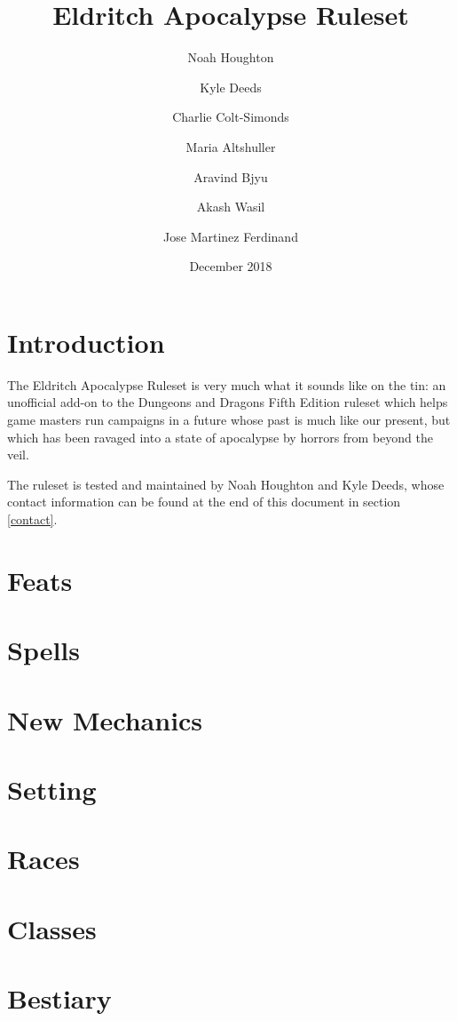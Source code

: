 \documentclass[letterpaper,10pt,twoside,twocolumn,openany]{dndbook}
\title{Eldritch Apocalypse Ruleset}
\author{Noah Houghton\and Kyle Deeds\and Charlie Colt-Simonds\and Maria Altshuller\and Aravind Bjyu\and Akash Wasil\and Jose Martinez Ferdinand}
\date{December 2018}
\begin{document}
\maketitle

\tableofcontents

\part{Introduction}
The Eldritch Apocalypse Ruleset is very much what it sounds like on the tin: an unofficial add-on to the Dungeons and Dragons Fifth Edition ruleset which helps game masters run campaigns in a future whose past is much like our present, but which has been ravaged into a state of apocalypse by horrors from beyond the veil. 

The ruleset is tested and maintained by Noah Houghton and Kyle Deeds, whose contact information can be found at the end of this document in section \hypertarget{contact}{\ref{contact}}. 

\part{Feats}


\part{Spells}


\part{New Mechanics}


\part{Setting}


\part{Races}


\part{Classes}


\part{Bestiary}

\end{document}
